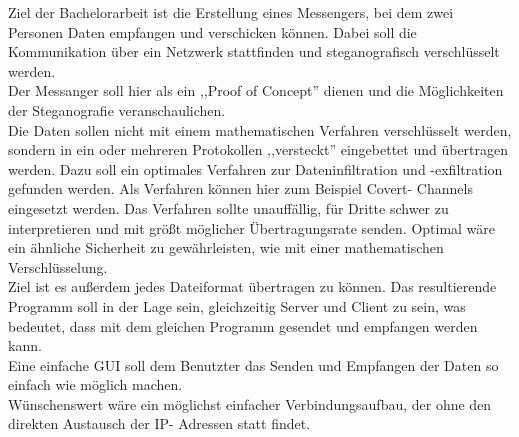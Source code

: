 Ziel der Bachelorarbeit ist die Erstellung eines Messengers, bei dem zwei Personen Daten empfangen und verschicken k\"onnen. Dabei soll die Kommunikation \"uber ein Netzwerk stattfinden und steganografisch verschl\"usselt werden.\\ Der Messanger soll hier als ein ,,Proof of Concept'' dienen und die M\"oglichkeiten der Steganografie veranschaulichen.\\ Die Daten sollen nicht mit einem mathematischen Verfahren verschl\"usselt werden, sondern in ein oder mehreren Protokollen ,,versteckt'' eingebettet und \"ubertragen werden. Dazu soll ein optimales Verfahren zur Dateninfiltration und -exfiltration gefunden werden. Als Verfahren k\"onnen hier zum Beispiel Covert- Channels eingesetzt werden. Das Verfahren sollte unauff\"allig, f\"ur Dritte schwer zu interpretieren und mit gr\"o{\ss}t m\"oglicher \"Ubertragungsrate senden. Optimal w\"are ein \"ahnliche Sicherheit zu gew\"ahrleisten, wie mit einer mathematischen Verschl\"usselung.\\
Ziel ist es au{\ss}erdem jedes Dateiformat \"ubertragen zu k\"onnen. Das resultierende Programm soll in der Lage sein, gleichzeitig Server und Client zu sein, was bedeutet, dass mit dem gleichen Programm gesendet und empfangen werden kann.\\
Eine einfache GUI soll dem Benutzter das Senden und Empfangen der Daten so einfach wie m\"oglich machen.\\
W\"unschenswert w\"are ein m\"oglichst einfacher Verbindungsaufbau, der ohne den direkten Austausch der IP- Adressen statt findet.\\


